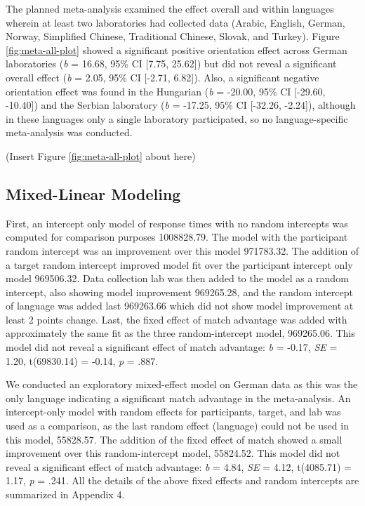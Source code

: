 \documentclass[
  man]{apa7}
\begin{document}
The planned meta-analysis examined the effect overall and within languages wherein at least two laboratories had collected data (Arabic, English, German, Norway, Simplified Chinese, Traditional Chinese, Slovak, and Turkey). Figure \ref{fig:meta-all-plot} showed a significant positive orientation effect across German laboratories (\emph{b} = 16.68, 95\% CI {[}7.75, 25.62{]}) but did not reveal a significant overall effect (\emph{b} = 2.05, 95\% CI {[}-2.71, 6.82{]}). Also, a significant negative orientation effect was found in the Hungarian (\emph{b} = -20.00, 95\% CI {[}-29.60, -10.40{]}) and the Serbian laboratory (\emph{b} = -17.25, 95\% CI {[}-32.26, -2.24{]}), although in these languages only a single laboratory participated, so no language-specific meta-analysis was conducted.

(Insert Figure \ref{fig:meta-all-plot} about here)

\hypertarget{mixed-linear-modeling}{%
\subsection{Mixed-Linear Modeling}\label{mixed-linear-modeling}}

First, an intercept only model of response times with no random intercepts was computed for comparison purposes 1008828.79. The model with the participant random intercept was an improvement over this model 971783.32. The addition of a target random intercept improved model fit over the participant intercept only model 969506.32. Data collection lab was then added to the model as a random intercept, also showing model improvement 969265.28, and the random intercept of language was added last 969263.66 which did not show model improvement at least 2 points change. Last, the fixed effect of match advantage was added with approximately the same fit as the three random-intercept model, 969265.06. This model did not reveal a significant effect of match advantage: \emph{b} = -0.17, \emph{SE} = 1.20, t(69830.14) = -0.14, \emph{p} = .887.

We conducted an exploratory mixed-effect model on German data as this was the only language indicating a significant match advantage in the meta-analysis. An intercept-only model with random effects for participants, target, and lab was used as a comparison, as the last random effect (language) could not be used in this model, 55828.57. The addition of the fixed effect of match showed a small improvement over this random-intercept model, 55824.52. This model did not reveal a significant effect of match advantage: \emph{b} = 4.84, \emph{SE} = 4.12, t(4085.71) = 1.17, \emph{p} = .241. All the details of the above fixed effects and random intercepts are summarized in Appendix 4.
\end{document}

